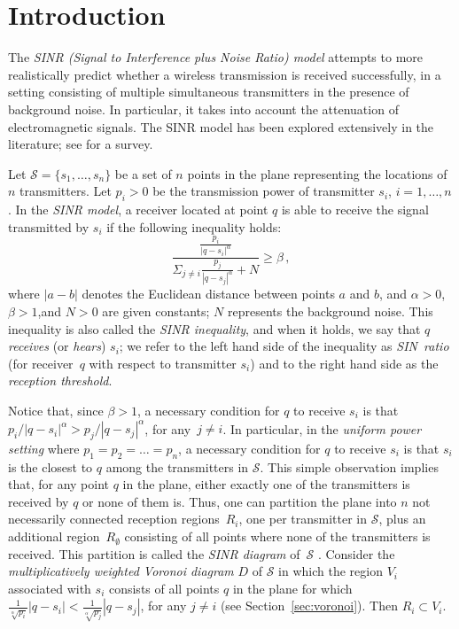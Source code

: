 \documentclass[11pt]{article}
\theoremstyle{remark}
\def\S{\mathcal{S}}
\begin{document}
\thispagestyle{empty}
\newpage
\setcounter{page}{1}

\section{Introduction}


The \emph{SINR (Signal to Interference plus Noise Ratio) model} attempts to more realistically predict whether a wireless transmission is received successfully, in a setting consisting of multiple simultaneous transmitters in the presence of background noise. In particular, it takes into account the attenuation of electromagnetic signals. The SINR model has been explored extensively in the literature; see \cite{lp-saSINRwm-10} for a survey. 

Let $\S = \{ s_1, \dots, s_n\}$ be a set of $n$ points in the plane representing the locations of $n$ transmitters.
Let $p_i>0$ be the transmission power of transmitter $s_i$, $i = 1, \ldots, n$. 
In the \emph{SINR model}, a receiver located at point $q$ is able to receive the signal transmitted by $s_i$ if the following inequality holds:
\[
\frac{\frac{p_i}{|q-s_i|^\alpha}}{\Sigma_{j \ne i}{\frac{p_j}{|q-s_j|^\alpha}} + N} \geq \beta \, ,
\]
where $|a-b|$ denotes the Euclidean distance between points $a$ and
$b$, and $\alpha > 0$, $\beta > 1$,and $N > 0$ are given constants; $N$ represents the background noise.
This inequality is also called the \emph{SINR inequality}, and when it holds, we say that $q$ \emph{receives} (or \emph{hears}) $s_i$; we refer to the left hand side of the inequality as \emph{SIN~ratio} (for receiver~$q$ with respect to transmitter $s_i$) and to the right hand side as the \emph{reception threshold}.

Notice that, since $\beta > 1$, a necessary condition for $q$ to receive $s_i$ is that $p_i/|q-s_i|^\alpha > p_j/|q-s_j|^\alpha$, for any~$j \ne i$. In particular, in the \emph{uniform power setting} where $p_1=p_2=\dots=p_n$, a necessary condition for $q$ to receive $s_i$ is that $s_i$ is the closest to $q$ among the transmitters in $\S$. This simple observation implies that, for any point $q$ in the plane, either exactly one of the transmitters is received by $q$ or none of them is. Thus, one can partition the plane into $n$ not necessarily connected reception regions~$R_i$, one per transmitter in $\S$, plus an additional region~$R_\emptyset$ consisting of all points where none of the transmitters is received. This partition is called the \emph{SINR diagram} of~$\S$ \cite{aeklpr-sdciawn-12}.
Consider the \emph{multiplicatively weighted Voronoi diagram} $D$ of $\S$ in which the region $V_i$ associated with $s_i$ consists of all points $q$ in the plane for which $\frac{1}{\sqrt[\alpha]{p_i}}|q-s_i| < \frac{1}{\sqrt[\alpha]{p_j}}|q-s_j|$, for any $j \ne i$ (see Section~\ref{sec:voronoi}).
Then $R_i \subset V_i$.
\end{document}
